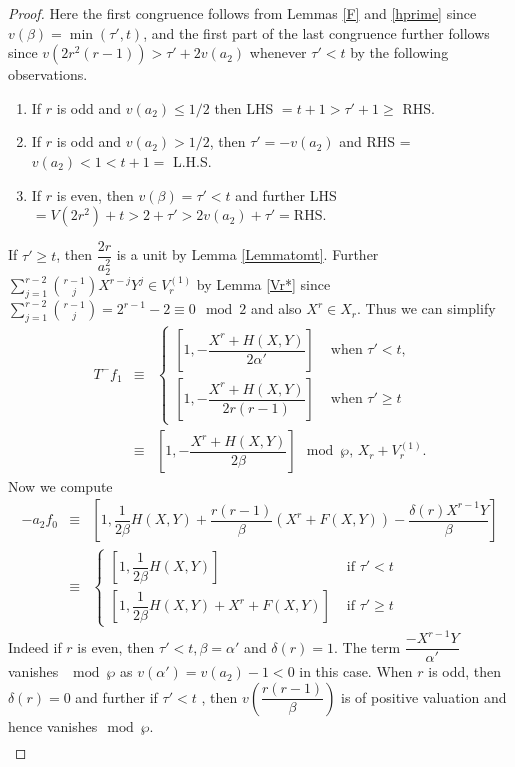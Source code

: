 \documentclass[11pt, reqno]{amsart}
\numberwithin{equation}{section}
\theoremstyle{definition}
\theoremstyle{remark}
\theoremstyle{definition}
\theoremstyle{remark}
\theoremstyle{remark}
\begin{document}
\begin{proof}
Here the first congruence follows from Lemmas \ref{F} and \ref{hprime} since $v(\beta)=\min(\tau',t)$, and the first part of the last congruence further follows since $v(2r^2(r-1))>\tau'+2v(a_2)$ whenever $\tau'<t$ by the following observations.
\begin{enumerate}
    \item If $r$ is odd and $v(a_2)\leq 1/2$ then LHS $= t+1>\tau'+1\geq$ RHS. 
    \item If $r$ is odd and $v(a_2)> 1/2$, then $\tau'=-v(a_2)$ and RHS = $v(a_2)<1<t+1=$ L.H.S.
    \item If $r$ is even, then $v(\beta)=\tau'<t$ and further LHS $= V(2r^2)+t>2+\tau'>2v(a_{2})+\tau'= $RHS.
    \end{enumerate} 
If $\tau'\geq t$, then $\dfrac{2r}{a_{2}^{2}}$ is a unit by Lemma \ref{Lemmatomt}. %
Further $\displaystyle\sum_{j=1}^{r-2}{r-1 \choose j}X^{r-j}Y^{j} \in V_{r}^{(1)}$ by Lemma \ref{Vr*} since 
$\displaystyle\sum_{j=1}^{r-2}{r-1 \choose j} = 2^{r-1}-2 \equiv 0 \mod 2$ and also $X^r\in X_r$. Thus we can simplify
\begin{eqnarray}\label{T-f1}
T^-f_{1} &\equiv& \begin{cases}
      \left[1,-\dfrac{X^r+H(X,Y)}{2\alpha'}\right] &\text{ when } \tau'<t,\\
      \left[1,-\dfrac{X^r+H(X,Y)}{2r(r-1)} \right]&\text{ when } \tau'\geq t      
      \end{cases}\\
     &\equiv & \left[1,-\dfrac{X^r+H(X,Y)}{2\beta}\right]\mod \wp,\, X_r+V_r^{(1)}.\nonumber
\end{eqnarray}
Now we compute %
\begin{eqnarray}\label{a2f0}
    -a_2f_0&\equiv &\left[1,\dfrac{1}{2\beta}H(X,Y)+\dfrac{r(r-1)}{\beta}(X^r+F(X,Y))-\dfrac{\delta(r)X^{r-1}Y}{\beta}\right]\nonumber\\
    &\equiv& \begin{cases}
\left[1,\dfrac{1}{2\beta}H(X,Y) \right] & \text{ if }\tau'<t\\
\left[1, \dfrac{1}{2\beta}H(X,Y)+X^r+F(X,Y)\right]& \text{ if }\tau'\geq t    \end{cases}
\end{eqnarray}
Indeed if  $r$ is even, then $\tau'<t,\beta = \alpha'$ and $\delta(r)=1$. The term $\dfrac{-X^{r-1}Y}{\alpha'}$ vanishes $\mod\wp$ as $v(\alpha') = v(a_{2})-1<0$ in this case. When $r$ is odd, then $\delta(r)=0$ and further if $\tau'<t$ , then $v\left(\dfrac{r(r-1)}{\beta}\right)$ is of positive valuation and hence vanishes$\mod\wp$. \begin{eqnarray}\label{T-f-1}

\end{eqnarray}
\end{proof}
\end{document}
